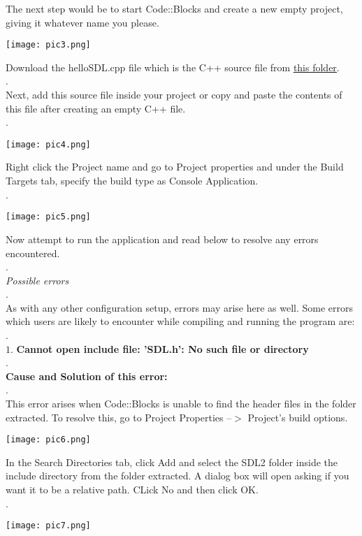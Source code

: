 \documentclass{article}
\begin{document}
\begin{flushleft}
		The next step would be to start Code::Blocks and create a new empty project, giving it whatever name you please.
	 \begin{center}
	 	\texttt{[image: pic3.png]}
	 \end{center}
	 Download the helloSDL.cpp file which is the C++ source file from \href{https://lazyfoo.net/tutorials/SDL/01_hello_SDL/01_hello_SDL.zip}{\underline{this folder}}.  \\.\\
		Next, add this source file inside your project or copy and paste the contents of this file after creating an empty C++ file. \\.\\
		\begin{center}
			\texttt{[image: pic4.png]}
		\end{center}
		Right click the Project name and go to Project properties and under the Build Targets tab, specify the build type as Console Application. \\.\\
		\begin{center}
			\texttt{[image: pic5.png]}
		\end{center}
		Now attempt to run the application and read below to resolve any errors encountered. \\.\\
		\textit{Possible errors}\\
		.\\
		As with any other configuration setup, errors may arise here as well. Some errors which users are likely to encounter while compiling and running the program are: \\
		.\\
		$ 1. $ 
		\textbf{Cannot open include file: 'SDL.h': No such file or directory}\\
		.\\
		\textbf{Cause and Solution of this error:} \\ .\\
		This error arises when Code::Blocks is unable to find the header files in the folder extracted. To resolve this, go to Project Properties --$ > $ Project's build options.
		\begin{center}
			\texttt{[image: pic6.png]}
		\end{center} In the Search Directories tab, click Add and select the SDL2 folder inside the include directory from the folder extracted. A dialog box will open asking if you want it to be a relative path. CLick No and then click OK.\\.\\
	\begin{center}
		\texttt{[image: pic7.png]}
	\end{center}
		

\end{flushleft}
\end{document}

